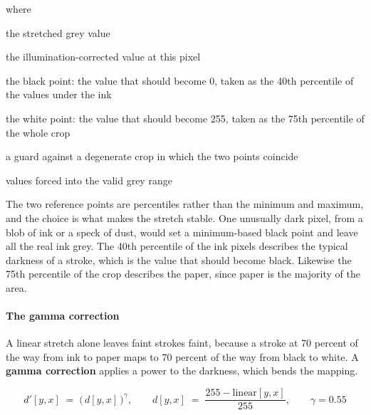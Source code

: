 \noindent where
\begin{description}[leftmargin=2.4em,style=nextline,font=\normalfont\ttfamily]\setlength\itemsep{1pt}
  \item[{$\mathrm{linear}[y,x]$}] \normalfont the stretched grey value
  \item[{$\mathrm{region}[y,x]$}] \normalfont the illumination-corrected value at this pixel
  \item[{$b$}] \normalfont the black point: the value that should become 0, taken as the 40th percentile of the values under the ink
  \item[{$w$}] \normalfont the white point: the value that should become 255, taken as the 75th percentile of the whole crop
  \item[{$\max(w-b,\,1)$}] \normalfont a guard against a degenerate crop in which the two points coincide
  \item[{$\mathrm{clip}(\cdot,0,255)$}] \normalfont values forced into the valid grey range
\end{description}
The two reference points are percentiles rather than the minimum and maximum, and the choice is what makes the stretch stable. One unusually dark pixel, from a blob of ink or a speck of dust, would set a minimum-based black point and leave all the real ink grey. The 40th percentile of the ink pixels describes the typical darkness of a stroke, which is the value that should become black. Likewise the 75th percentile of the crop describes the paper, since paper is the majority of the area.


\paragraph{The gamma correction}
A linear stretch alone leaves faint strokes faint, because a stroke at 70 percent of the way from ink to paper maps to 70 percent of the way from black to white. A \textbf{gamma correction} applies a power to the darkness, which bends the mapping.


\begin{equation}
d'[y,x] \;=\; \Big(\,d[y,x]\,\Big)^{\gamma}, \qquad d[y,x] \;=\; \frac{255 - \mathrm{linear}[y,x]}{255}, \qquad \gamma = 0.55
\end{equation}

